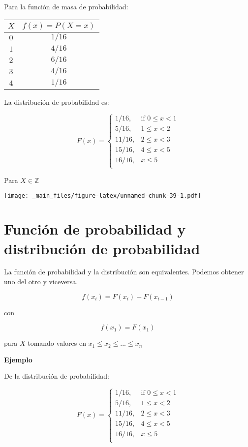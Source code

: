 \documentclass[
]{book}
\begin{document}
Para la función de masa de probabilidad:

\begin{longtable}[]{@{}cc@{}}
\toprule
\(X\) & \(f(x)=P(X=x)\) \\
\midrule
\endhead
\(0\) & \(1/16\) \\
\(1\) & \(4/16\) \\
\(2\) & \(6/16\) \\
\(3\) & \(4/16\) \\
\(4\) & \(1/16\) \\
\bottomrule
\end{longtable}

La distribución de probabilidad es:

\[
    F(x)=
\begin{cases}
    1/16,& \text{if } 0 \leq x < 1\\
    5/16,& 1\leq x < 2\\
    11/16,& 2\leq x < 3\\
    15/16,& 4\leq x < 5\\
    16/16,&  x \leq 5\\
\end{cases}
\]

Para \(X \in \mathbb{Z}\)

\texttt{[image: \_main\_files/figure-latex/unnamed-chunk-39-1.pdf]}

\hypertarget{funciuxf3n-de-probabilidad-y-distribuciuxf3n-de-probabilidad}{%
\section{Función de probabilidad y distribución de probabilidad}\label{funciuxf3n-de-probabilidad-y-distribuciuxf3n-de-probabilidad}}

La función de probabilidad y la distribución son equivalentes. Podemos obtener uno del otro y viceversa.

\[f(x_i)=F(x_i)-F(x_{i-1})\]

con

\[f(x_1)=F(x_1)\]

para \(X\) tomando valores en \(x_1 \leq x_2 \leq ... \leq x_n\)

\textbf{Ejemplo}

De la distribución de probabilidad:

\[
    F(x)=
\begin{cases}
    1/16,& \text{if } 0 \leq x < 1\\
    5/16,& 1\leq x < 2\\
    11/16,& 2\leq x < 3\\
    15/16,& 4\leq x < 5\\
    16/16,&  x \leq 5\\
\end{cases}
\]
\end{document}
